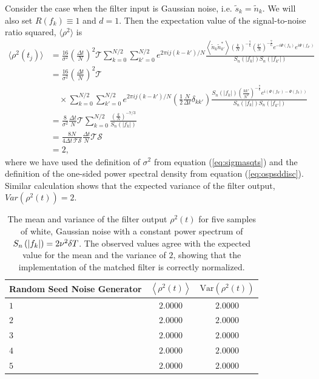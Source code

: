 Consider the case when the filter input is Gaussian noise, i.e. $\tilde{s}_k =
\tilde{n}_k$.  We will also set $R(f_k)\equiv 1$ and $d = 1$.  Then the expectation
value of the signal-to-noise ratio squared, $\langle \rho^2
\rangle$ is
\begin{equation}
\begin{split}
\langle \rho^2(t_j) \rangle &=
\frac{16}{\sigma^2}\left(\frac{\Delta t}{N}\right)^2 \mathcal{T}
  \sum_{k=0}^{N/2} \sum_{k'=0}^{N/2} 
  e^{2\pi ij(k-k')/N} 
  \frac{\left\langle \tilde{n}_k \tilde{n}_{k'}^{\ast} \right\rangle 
        \left(\frac{k}{N}\right)^{-\frac{7}{6}} \left(\frac{k'}{N}\right)^{-\frac{7}{6}}
        e^{-i\Psi(f_k)} e^{i\Psi(f_{k'})}}
       {S_n\left(\left|f_k\right|\right)S_n\left(\left|f_{k'}\right|\right)} \\
&= 
\frac{16}{\sigma^2}\left(\frac{\Delta t}{N}\right)^2 \mathcal{T} \\
&\quad\times
  \sum_{k=0}^{N/2} \sum_{k'=0}^{N/2} 
  e^{2\pi ij(k-k')/N} \left(\frac{1}{2} \frac{N}{\Delta t}  \delta_{kk'} \right) 
  \frac{ S_n\left(\left|f_k\right|\right)
        \left(\frac{kk'}{N^2}\right)^{-\frac{7}{6}}
        e^{i ( \Psi(f_{k'}) - \Psi(f_k) )}}
       {S_n\left(\left|f_k\right|\right)S_n\left(\left|f_{k'}\right|\right)} \\
&= 
\frac{8}{\sigma^2} \frac{\Delta t}{N} \mathcal{T}
  \sum_{k=0}^{N/2}
  \frac{ \left(\frac{k}{N}\right)^{-7/3} }
       {S_n\left(\left|f_k\right|\right)} \\
&= 
\frac{8N}{4\Delta t\, \mathcal{T}\mathcal{S}} \frac{\Delta t}{N} \mathcal{T} \mathcal{S} \\
&= 2,
\label{eq:filternorm}
\end{split}
\end{equation}
where we have used the definition of $\sigma^2$ from equation
(\ref{eq:sigmasqts}) and the definition of the one-sided power spectral
density from equation (\ref{eq:ospsddisc}). Similar calculation shows that 
the expected variance of the filter output, $\mathit{Var}( \rho^2(t) ) = 2$. 
\begin{table}[htb]
  \begin{center}
  \begin{tabular}{l|c|c}
  Random Seed Noise Generator& $\left\langle \rho^2(t) \right\rangle$ & $\mathrm{Var}( \rho^2(t) )$\\
  \hline
  $1$ & $2.0000$ & $2.0000$ \\
  $2$ & $2.0000$ & $2.0000$ \\
  $3$ & $2.0000$ & $2.0000$ \\
  $4$ & $2.0000$ & $2.0000$ \\
  $5$ & $2.0000$ & $2.0000$ \\
  \end{tabular}
  \end{center}
  \caption{%
  The mean and variance of the filter output $\rho^2(t)$ for five samples of
  white, Gaussian noise with a constant power spectrum of $S_n\left(\left|f_{k}\right|\right) =
  2\nu^2\delta T$. The observed values agree with the expected value for the
  mean and the variance of $2$, showing that the implementation of the matched
  filter is correctly normalized.
  }
\label{t:normresults}
\end{table}

